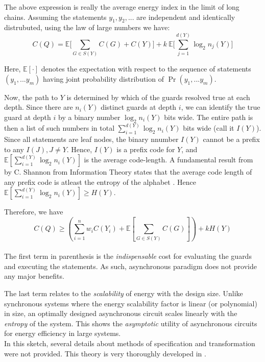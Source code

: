 The above expression is really the average energy index in the limit of long
chains. Assuming the statements $y_1, y_2, ...$ are independent and identically
distrubuted, using the law of large numbers we have:
\begin{equation}\label{eqn:simplified_cost}
	C(Q) = \mathbb{E} \Big[\sum_{G \in S(Y)} C(G) + C(Y) \Big] 
		+ k\ \mathbb{E} \Big[\sum_{j=1}^{d(Y)} \log_2{n_{j}(Y)} \Big] 
\end{equation}

Here, $\mathbb{E[\cdot]}$ denotes the expectation with respect to the sequence
of statements $(y_1,...y_m)$ having joint probability distribution of
$\Pr(y_1,...y_m)$.

Now, the path to $Y$ is determined by which of the guards resolved true at each
depth. Since there are $n_i(Y)$ distinct guards at depth $i$, we can identify
the true guard at depth $i$ by a binary number $\log_2{n_i(Y)}$ bits wide. The
entire path is then a list of such numbers in total 
$\sum_{i=1}^{d(Y)} \log_2 n_i(Y)$ bits wide (call it $I(Y)$).
Since all statements are leaf nodes, the binary nnumber $I(Y)$ cannot be a
prefix to any $I(J), J \ne Y$. Hence, $I(Y)$ is a prefix code for $Y$, and 
$\mathbb{E}[\sum_{i=1}^{d(Y)} \log_2n_i(Y)]$ is the average code-length. 
A fundamental result from by C. Shannon from Information Theory states that the
average code length of any prefix code is atleast the entropy of the alphabet
\cite{shannon_paper}. 
Hence $\mathbb{E}[\sum_{i=1}^{d(Y)} \log_2n_i(Y)] \ge H(Y)$. 

Therefore, we have 
\begin{equation}
	C(Q) \ge (\sum_{i=1}^{n} w_i C(Y_i) + \mathbb{E}[\sum_{G \in S(Y)} C(G)] ) + k H(Y)
\end{equation}
\\

The first term in parenthesis is the \emph{indispensable} cost for evaluating the guards
and executing the statements. As such, asynchronous paradigm does not provide
any major benefits.

The last term relates to the \emph{scalability}
of energy with the design size. Unlike synchronous systems where the energy scalability
factor is linear (or polynomial) in size, an optimally designed
asynchronous circuit scales linearly with the \emph{entropy} of the system. 
This shows the \emph{asymptotic} utility of asynchronous circuits
for energy efficiency in large systems.
\\

In this sketch, several details about methods of specification and
transformation were not provided. This theory is very thoroughly 
developed in \cite{entropy_thesis} \cite{entropy_paper}. 
